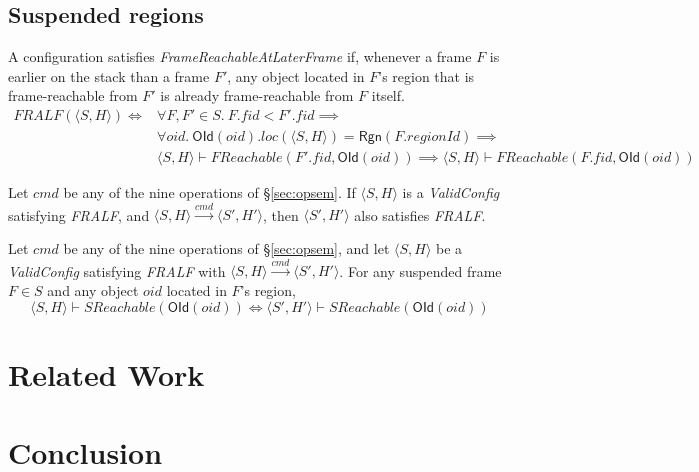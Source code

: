 \documentclass[acmsmall,nonacm,screen]{acmart}
\newcommand{\inN}{\!\in\!}
\begin{document}
\subsection{Suspended regions}
\label{sec:suspended}

\begin{definition}[FrameReachableAtLaterFrame]
\label{def:fralf}
A configuration satisfies \textit{FrameReachableAtLaterFrame} if, whenever a frame $F$ is earlier on the stack than a frame $F'$, any object located in $F$'s region that is frame-reachable from $F'$ is already frame-reachable from $F$ itself.
\begin{align*}
  \mathit{FRALF}(\langle S, H \rangle) \iff{} & \forall F, F' \inN S.\ F.fid < F'.fid \implies{} \\
  & \forall oid.\ \mathsf{OId}(oid).loc(\langle S, H \rangle) = \mathsf{Rgn}(F.regionId) \implies{} \\
  & \langle S, H \rangle \vdash FReachable(F'.fid, \mathsf{OId}(oid)) \implies \langle S, H \rangle \vdash FReachable(F.fid, \mathsf{OId}(oid))
\end{align*}
\end{definition}

\begin{theorem}
\label{thm:fralf-step}
Let $cmd$ be any of the nine operations of \S\ref{sec:opsem}. If $\langle S, H \rangle$ is a \textit{ValidConfig} satisfying \textit{FRALF}, and $\langle S, H \rangle \xrightarrow{cmd} \langle S', H' \rangle$, then $\langle S', H' \rangle$ also satisfies \textit{FRALF}.
\end{theorem}

\begin{theorem}
\label{thm:suspended-invariant}
Let $cmd$ be any of the nine operations of \S\ref{sec:opsem}, and let $\langle S, H \rangle$ be a \textit{ValidConfig} satisfying \textit{FRALF} with $\langle S, H \rangle \xrightarrow{cmd} \langle S', H' \rangle$. For any suspended frame $F \inN S$ and any object $oid$ located in $F$'s region,
\[
  \langle S, H \rangle \vdash SReachable(\mathsf{OId}(oid)) \iff \langle S', H' \rangle \vdash SReachable(\mathsf{OId}(oid))
\]
\end{theorem}

\section{Related Work}

\section{Conclusion}
\end{document}
